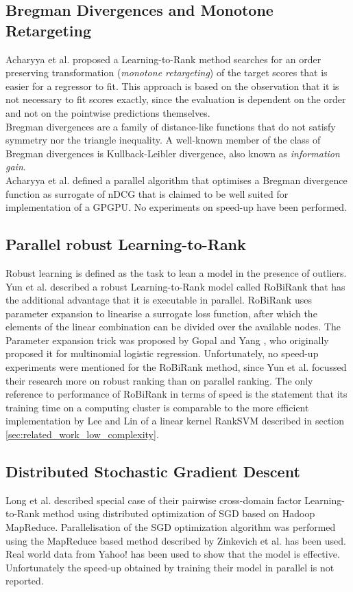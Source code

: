 \subsection{Bregman Divergences and Monotone Retargeting}
Acharyya et al. \cite{Acharyya2012, Acharyya2013} proposed a Learning-to-Rank method searches for an order preserving transformation (\emph{monotone retargeting}) of the target scores that is easier for a regressor to fit. This approach is based on the observation that it is not necessary to fit scores exactly, since the evaluation is dependent on the order and not on the pointwise predictions themselves.\\

Bregman divergences are a family of distance-like functions that do not satisfy symmetry nor the triangle inequality. A well-known member of the class of Bregman divergences is Kullback-Leibler divergence, also known as \emph{information gain}.\\

Acharyya et al. \cite{Acharyya2012, Acharyya2013} defined a parallel algorithm that optimises a Bregman divergence function as surrogate of \ac{nDCG} that is claimed to be well suited for implementation of a \ac{GPGPU}. No experiments on speed-up have been performed.
\subsection{Parallel robust Learning-to-Rank}
Robust learning \cite{Huber1981} is defined as the task to lean a model in the presence of outliers. Yun et al. described a \cite{Yun2014} robust Learning-to-Rank model called RoBiRank that has the additional advantage that it is executable in parallel. RoBiRank uses parameter expansion to linearise a surrogate loss function, after which the elements of the linear combination can be divided over the available nodes. The Parameter expansion trick was proposed by Gopal and Yang \cite{Gopal2013}, who originally proposed it for multinomial logistic regression. Unfortunately, no speed-up experiments were mentioned for the RoBiRank method, since Yun et al. focussed their research more on robust ranking than on parallel ranking. The only reference to performance of RoBiRank in terms of speed is the statement that its training time on a computing cluster is comparable to the more efficient implementation by Lee and Lin \cite{Lee2014} of a linear kernel Rank\ac{SVM} \cite{Herbrich1999, Joachims2002} described in section \ref{sec:related_work_low_complexity}.
\subsection{Distributed Stochastic Gradient Descent}
Long et al. \cite{Long2012} described special case of their pairwise cross-domain factor Learning-to-Rank method using distributed optimization of \ac{SGD} based on Hadoop MapReduce. Parallelisation of the \ac{SGD} optimization algorithm was performed using the MapReduce based method described by  Zinkevich et al. \cite{Zinkevich2010} has been used. Real world data from Yahoo! has been used to show that the model is effective. Unfortunately the speed-up obtained by training their model in parallel is not reported.\\

